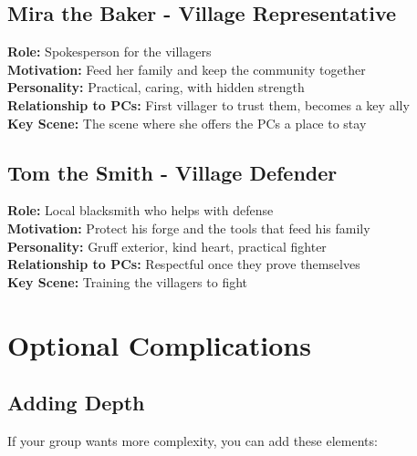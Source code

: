\documentclass[11pt]{article}
\newenvironment{characterbox}[1]{%
  \begin{mdframed}[backgroundcolor=shadecolor, linewidth=1pt, linecolor=headercolor]%
  \subsection*{#1}%
}{%
  \end{mdframed}%
}
\begin{document}
\begin{characterbox}{Mira the Baker - Village Representative}
\textbf{Role:} Spokesperson for the villagers \\
\textbf{Motivation:} Feed her family and keep the community together \\
\textbf{Personality:} Practical, caring, with hidden strength \\
\textbf{Relationship to PCs:} First villager to trust them, becomes a key ally \\
\textbf{Key Scene:} The scene where she offers the PCs a place to stay
\end{characterbox}

\begin{characterbox}{Tom the Smith - Village Defender}
\textbf{Role:} Local blacksmith who helps with defense \\
\textbf{Motivation:} Protect his forge and the tools that feed his family \\
\textbf{Personality:} Gruff exterior, kind heart, practical fighter \\
\textbf{Relationship to PCs:} Respectful once they prove themselves \\
\textbf{Key Scene:} Training the villagers to fight
\end{characterbox}

\section{Optional Complications}

\subsection{Adding Depth}

If your group wants more complexity, you can add these elements:
\end{document}
